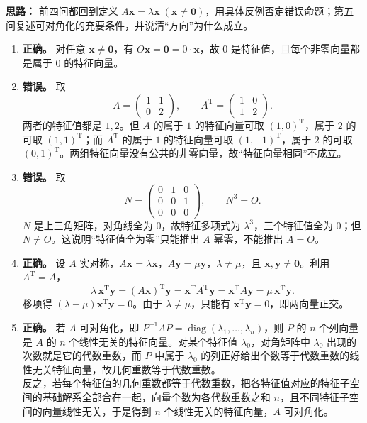 \ifshowsolutions%
\textbf{思路：} 前四问都回到定义 \(A\mathbf{x}=\lambda\mathbf{x}\;(\mathbf{x}\neq\mathbf{0})\)，用具体反例否定错误命题；第五问复述可对角化的充要条件，并说清“方向”为什么成立。

\begin{enumerate}[label=(\arabic*)]
  \item \textbf{正确。} 对任意 \(\mathbf{x}\neq\mathbf{0}\)，有 \(O\mathbf{x}=\mathbf{0}=0\cdot\mathbf{x}\)，故 \(0\) 是特征值，且每个非零向量都是属于 \(0\) 的特征向量。
  \item \textbf{错误。} 取
  \[
  A=\begin{pmatrix}1&1\\0&2\end{pmatrix},\qquad
  A^{\mathrm{T}}=\begin{pmatrix}1&0\\1&2\end{pmatrix}.
  \]
  两者的特征值都是 \(1,2\)。但 \(A\) 的属于 \(1\) 的特征向量可取 \((1,0)^{\mathrm{T}}\)，属于 \(2\) 的可取 \((1,1)^{\mathrm{T}}\)；而 \(A^{\mathrm{T}}\) 的属于 \(1\) 的特征向量可取 \((1,-1)^{\mathrm{T}}\)，属于 \(2\) 的可取 \((0,1)^{\mathrm{T}}\)。两组特征向量没有公共的非零向量，故“特征向量相同”不成立。
  \item \textbf{错误。} 取
  \[
  N=\begin{pmatrix}0&1&0\\0&0&1\\0&0&0\end{pmatrix},\qquad N^3=O.
  \]
  \(N\) 是上三角矩阵，对角线全为 \(0\)，故特征多项式为 \(\lambda^3\)，三个特征值全为 \(0\)；但 \(N\neq O\)。这说明“特征值全为零”只能推出 \(A\) 幂零，不能推出 \(A=O\)。
  \item \textbf{正确。} 设 \(A\) 实对称，\(A\mathbf{x}=\lambda\mathbf{x}\)，\(A\mathbf{y}=\mu\mathbf{y}\)，\(\lambda\neq\mu\)，且 \(\mathbf{x},\mathbf{y}\neq\mathbf{0}\)。利用 \(A^{\mathrm{T}}=A\)，
  \[
  \lambda\,\mathbf{x}^{\mathrm{T}}\mathbf{y}
  =(A\mathbf{x})^{\mathrm{T}}\mathbf{y}
  =\mathbf{x}^{\mathrm{T}}A^{\mathrm{T}}\mathbf{y}
  =\mathbf{x}^{\mathrm{T}}A\mathbf{y}
  =\mu\,\mathbf{x}^{\mathrm{T}}\mathbf{y}.
  \]
  移项得 \((\lambda-\mu)\mathbf{x}^{\mathrm{T}}\mathbf{y}=0\)。由于 \(\lambda\neq\mu\)，只能有 \(\mathbf{x}^{\mathrm{T}}\mathbf{y}=0\)，即两向量正交。
  \item \textbf{正确。} 若 \(A\) 可对角化，即 \(P^{-1}AP=\operatorname{diag}(\lambda_1,\ldots,\lambda_n)\)，则 \(P\) 的 \(n\) 个列向量是 \(A\) 的 \(n\) 个线性无关的特征向量。对某个特征值 \(\lambda_0\)，对角矩阵中 \(\lambda_0\) 出现的次数就是它的代数重数，而 \(P\) 中属于 \(\lambda_0\) 的列正好给出个数等于代数重数的线性无关特征向量，故几何重数等于代数重数。\\
  反之，若每个特征值的几何重数都等于代数重数，把各特征值对应的特征子空间的基础解系全部合在一起，向量个数为各代数重数之和 \(n\)，且不同特征子空间的向量线性无关，于是得到 \(n\) 个线性无关的特征向量，\(A\) 可对角化。
\end{enumerate}

